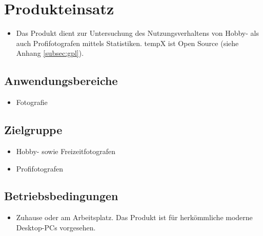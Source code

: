 \section{Produkteinsatz}
  \begin{itemize}
  \item Das Produkt dient zur Untersuchung des Nutzungsverhaltens von Hobby- als auch Profifotografen mittels Statistiken. \gls{tempX} ist Open Source (siehe Anhang \ref{subsec:gpl}).
  \end{itemize}
\subsection{Anwendungsbereiche}
  \begin{itemize}
  \item Fotografie
  \end{itemize}

\subsection{Zielgruppe}
	\begin{itemize}
		\item Hobby- sowie Freizeitfotografen
		\item Profifotografen		
	\end{itemize}

\subsection{Betriebsbedingungen}
  \begin{itemize}
  		\item Zuhause oder am Arbeitsplatz. Das Produkt ist für herkömmliche moderne Desktop-PCs vorgesehen.
  \end{itemize}
